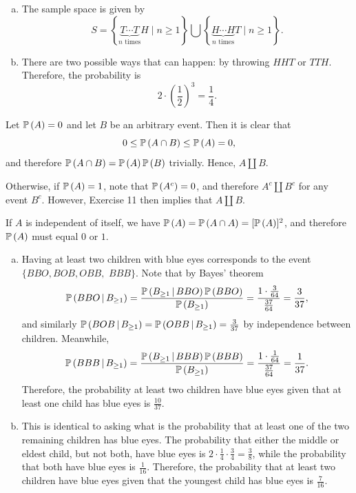 \begin{ex}
  \begin{enumerate}[(a)]
    \item The sample space is given by
          \[
            S=\left\{
            \underbrace{T\cdots T}_{n\text{ times}}H \mid n\geq 1
            \right\} \bigcup
            \left\{
            \underbrace{H\cdots H}_{n\text{ times}}T \mid n\geq 1
            \right\}.
          \]
    \item There are two possible ways that can happen: by throwing $HHT$ or
          $TTH$. Therefore, the probability is
          \[
            2\cdot \left(\frac{1}{2}\right)^3=\frac{1}{4}.
          \]
  \end{enumerate}
\end{ex}

\begin{ex}
  Let $\P{A}=0$ and let $B$ be an arbitrary event. Then it is clear that
  \[
    0\leq \P{A\cap B}\leq \P{A}=0,
  \]
  and therefore $\P{A\cap B}=\P{A}\P{B}$ trivially. Hence, $A\amalg B$.

  Otherwise, if $\P{A}=1$, note that $\P{A^c}=0$, and therefore $A^c\amalg B^c$
  for any event $B^c$. However, Exercise 11 then implies that $A\amalg B$.

  If $A$ is independent of itself, we have $\P{A}=\P{A\cap A}=[\P{A}]^2$, and
  therefore $\P{A}$ must equal $0$ or $1$.
\end{ex}

\begin{ex}
  \begin{enumerate}[(a)]
    \item Having at least two children with blue eyes corresponds to the event
          $\{BBO, BOB, OBB,$ $BBB\}$. Note that by Bayes' theorem
          \[
            \cP{BBO}{B_{\geq 1}}
            =\frac{\cP{B_{\geq 1}}{BBO}\P{BBO}}{\P{B_{\geq 1}}}
            =\frac{1\cdot \frac{3}{64}}{\frac{37}{64}}
            =\frac{3}{37},
          \]
          and similarly $\cP{BOB}{B_{\geq 1}}=\cP{OBB}{B_{\geq 1}}=\frac{3}{37}$
          by independence between children. Meanwhile,
          \[
            \cP{BBB}{B_{\geq 1}}
            =\frac{\cP{B_{\geq 1}}{BBB}\P{BBB}}{\P{B_{\geq 1}}}
            =\frac{1\cdot \frac{1}{64}}{\frac{37}{64}}
            =\frac{1}{37}.
          \]
          Therefore, the probability at least two children have blue eyes given
          that at least one child has blue eyes is $\frac{10}{37}$.

    \item This is identical to asking what is the probability that at least one
          of the two remaining children has blue eyes. The probability that
          either the middle or eldest child, but not both, have blue eyes is
          $2\cdot \frac{1}{4}\cdot\frac{3}{4}=\frac{3}{8}$, while the
          probability that both have blue eyes is $\frac{1}{16}$. Therefore,
          the probability that at least two children have blue eyes given that
          the youngest child has blue eyes is $\frac{7}{16}$.
  \end{enumerate}
\end{ex}

